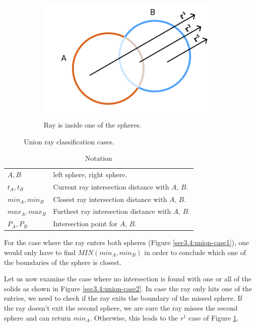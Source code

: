 \documentclass[a4paper,11pt,oneside]{article}
\begin{document}
\begin{figure}[ht]
\begin{subfigure}[b]{0.3\textwidth}
         \includegraphics[width=\textwidth]{section3/3.4/union-case-3.png}
         \caption{Ray is inside one of the spheres.}
         \label{sec3.4:union-case3}
     \end{subfigure}
        \caption{Union ray classification cases.}
        \label{sec3.4:sphere-union}
\end{figure}

\begin{table}
	\caption{Notation}
	\label{table:notations2}
	\begin{tabularx}{\textwidth}{p{}X}
		\toprule
		$A, B$									     & left sphere, right sphere. 						   \\
		$t_A, t_B$                                   & Current ray intersection distance with $A$, $B$.   \\
		$min_A, min_B$                               & Closest ray intersection distance with $A$, $B$.   \\
		$max_A, max_B$                               & Furthest ray intersection distance with $A$, $B$.  \\
		$P_A, P_B$                                   & Intersection point for $A$, $B$. \\
		\bottomrule
	\end{tabularx}
\end{table}

For the case where the ray enters both spheres (Figure \ref{sec3.4:union-case1}), one would only have to find $MIN(min_A, min_B)$ in order to conclude which one of the boundaries of the sphere is closest.

Let us now examine the case where no intersection is found with one or all of the solids as shown in Figure \ref{sec3.4:union-case2}. In case the ray only hits one of the entries, we need to check if the ray exits the boundary of the missed sphere. If the ray doesn't exit the second sphere, we are sure the ray misses the second sphere and can return $min_A$. Otherwise, this leads to the $r^1$ case of Figure \ref{sec3.4:union-case3}.
\end{document}

